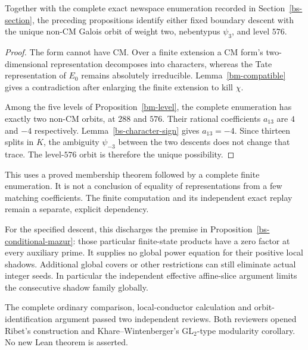 \begin{theorem}\label{bm-orbit}
Together with the complete exact newspace enumeration recorded in
Section~\ref{bs-section}, the preceding propositions identify either
fixed boundary descent with the unique non-CM Galois orbit of weight
two, nebentypus $\psi_3$, and level $576$.
\end{theorem}
\begin{proof}
The form cannot have CM. Over a finite extension a CM form's
two-dimensional representation decomposes into characters, whereas
the Tate representation of $E_0$ remains absolutely irreducible.
Lemma~\ref{bm-compatible} gives a contradiction after enlarging
the finite extension to kill $\chi$.

Among the five levels of Proposition~\ref{bm-level}, the complete
enumeration has exactly two non-CM orbits, at $288$ and $576$.
Their rational coefficients $a_{13}$ are $4$ and $-4$ respectively.
Lemma~\ref{bs-character-sign} gives $a_{13}=-4$. Since thirteen
splits in $K$, the ambiguity $\psi_{-3}$ between the two descents
does not change that trace. The level-$576$ orbit is therefore the
unique possibility.
\end{proof}

This uses a proved membership theorem followed by a complete finite
enumeration. It is not a conclusion of equality of representations
from a few matching coefficients. The finite computation and its
independent exact replay remain a separate, explicit dependency.

For the specified descent, this discharges the premise in
Proposition~\ref{bs-conditional-mazur}: those particular finite-state
products have a zero factor at every auxiliary prime. It supplies
no global power equation for their positive local shadows. Additional
global covers or other restrictions can still eliminate actual
integer seeds. In particular the independent effective affine-slice
argument limits the consecutive shadow family globally.

The complete ordinary comparison, local-conductor calculation and
orbit-identification argument passed two independent reviews. Both
reviewers opened Ribet's construction and Khare--Wintenberger's
GL$_2$-type modularity corollary. No new Lean theorem is asserted.
